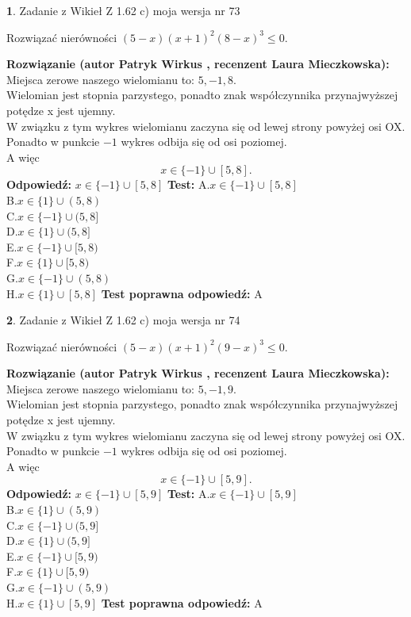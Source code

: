\documentclass[12pt, a4paper]{article}
\theoremstyle{definition} %
\newtheorem{zad}{}
\newcommand{\zadStart}[1]{\begin{zad}#1\newline}
\newcommand{\zadStop}{\end{zad}}
\newcommand{\rozwStart}[2]{\noindent \textbf{Rozwiązanie (autor #1 , recenzent #2): }\newline}
\newcommand{\rozwStop}{\newline}
\newcommand{\odpStart}{\noindent \textbf{Odpowiedź:}\newline}
\newcommand{\odpStop}{\newline}
\newcommand{\testStart}{\noindent \textbf{Test:}\newline}
\newcommand{\testStop}{\newline}
\newcommand{\kluczStart}{\noindent \textbf{Test poprawna odpowiedź:}\newline}
\newcommand{\kluczStop}{\newline}
\begin{document}
\zadStart{Zadanie z Wikieł Z 1.62 c) moja wersja nr 73}

Rozwiązać nierówności $(5-x)(x+1)^{2}(8-x)^{3}\le0$.
\zadStop
\rozwStart{Patryk Wirkus}{Laura Mieczkowska}
Miejsca zerowe naszego wielomianu to: $5, -1, 8$.\\
Wielomian jest stopnia parzystego, ponadto znak współczynnika przy\linebreak najwyższej potędze x jest ujemny.\\ W związku z tym wykres wielomianu zaczyna się od lewej strony powyżej osi OX.\\
Ponadto w punkcie $-1$ wykres odbija się od osi poziomej.\\
A więc $$x \in \{-1\} \cup [5,8].$$
\rozwStop
\odpStart
$x \in \{-1\} \cup [5,8]$
\odpStop
\testStart
A.$x \in \{-1\} \cup [5,8]$\\
B.$x \in \{1\} \cup (5,8)$\\
C.$x \in \{-1\} \cup (5,8]$\\
D.$x \in \{1\} \cup (5,8]$\\
E.$x \in \{-1\} \cup [5,8)$\\
F.$x \in \{1\} \cup [5,8)$\\
G.$x \in \{-1\} \cup (5,8)$\\
H.$x \in \{1\} \cup [5,8]$
\testStop
\kluczStart
A
\kluczStop



\zadStart{Zadanie z Wikieł Z 1.62 c) moja wersja nr 74}

Rozwiązać nierówności $(5-x)(x+1)^{2}(9-x)^{3}\le0$.
\zadStop
\rozwStart{Patryk Wirkus}{Laura Mieczkowska}
Miejsca zerowe naszego wielomianu to: $5, -1, 9$.\\
Wielomian jest stopnia parzystego, ponadto znak współczynnika przy\linebreak najwyższej potędze x jest ujemny.\\ W związku z tym wykres wielomianu zaczyna się od lewej strony powyżej osi OX.\\
Ponadto w punkcie $-1$ wykres odbija się od osi poziomej.\\
A więc $$x \in \{-1\} \cup [5,9].$$
\rozwStop
\odpStart
$x \in \{-1\} \cup [5,9]$
\odpStop
\testStart
A.$x \in \{-1\} \cup [5,9]$\\
B.$x \in \{1\} \cup (5,9)$\\
C.$x \in \{-1\} \cup (5,9]$\\
D.$x \in \{1\} \cup (5,9]$\\
E.$x \in \{-1\} \cup [5,9)$\\
F.$x \in \{1\} \cup [5,9)$\\
G.$x \in \{-1\} \cup (5,9)$\\
H.$x \in \{1\} \cup [5,9]$
\testStop
\kluczStart
A
\kluczStop
\end{document}
